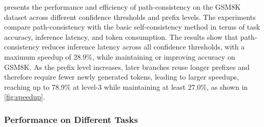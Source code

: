

 presents the performance and efficiency of path-consistency on the GSM8K dataset across different confidence thresholds and prefix levels. The experiments compare path-consistency with the basic self-consistency method in terms of task accuracy, inference latency, and token consumption. 
The results show that path-consistency reduces inference latency across all confidence thresholds, with a maximum speedup of 28.9\%, while maintaining or improving accuracy on GSM8K.
As the prefix level increases, later branches reuse longer prefixes and therefore require fewer newly generated tokens, leading to larger speedups, reaching up to 78.9\% at level-3 while maintaining at least 27.0\%, as shown in \cref{fig:speedup}. 

\subsubsection{Performance on Different Tasks}

